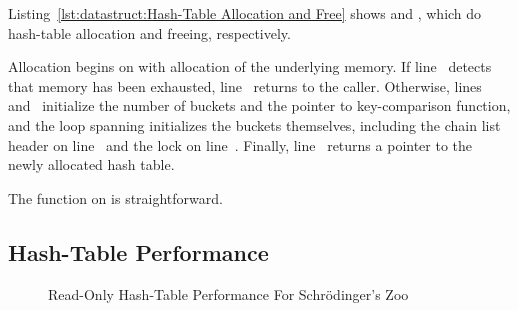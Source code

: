 Listing~\ref{lst:datastruct:Hash-Table Allocation and Free}
shows  and ,
which do hash-table allocation and freeing, respectively.
\begin{fcvref}
Allocation begins on
 with allocation of the underlying memory.
If line~ detects that memory has been exhausted,
line~ returns
 to the caller.
Otherwise, lines~ and~ initialize
the number of buckets and the pointer to key-comparison function,
and the loop
spanning  initializes the buckets themselves,
including the chain list header on
line~ and the lock on line~.
Finally, line~ returns a pointer to the newly allocated hash table.
\end{fcvref}
\begin{fcvref}
The  function on
 is straightforward.
\end{fcvref}

\fi

\subsection{Hash-Table Performance}
\label{sec:datastruct:Hash-Table Performance}

\begin{figure}[tb]
\centering
{}
\caption{Read-Only Hash-Table Performance For Schr\"odinger's Zoo}
\label{fig:datastruct:Read-Only Hash-Table Performance For Schroedinger's Zoo}
\end{figure}


